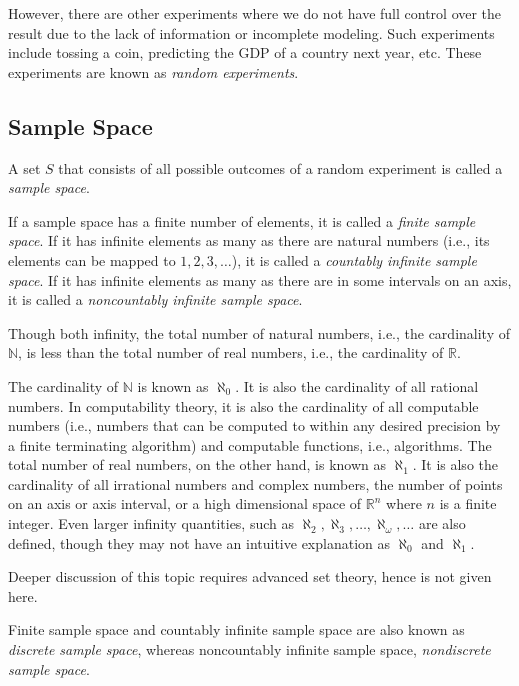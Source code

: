 However, there are other experiments where we do not have full control over the result due to the lack of information or incomplete modeling. Such experiments include tossing a coin, predicting the GDP of a country next year, etc. These experiments are known as \textit{random experiments}.

\subsection{Sample Space}

A set $S$ that consists of all possible outcomes of a random experiment is called a \textit{sample space}. 

If a sample space has a finite number of elements, it is called a \textit{finite sample space}. If it has infinite elements as many as there are natural numbers (i.e., its elements can be mapped to $1, 2, 3, \ldots$), it is called a \textit{countably infinite sample space}. If it has infinite elements as many as there are in some intervals on an axis, it is called a \textit{noncountably infinite sample space}. 

\begin{shortbox}
Though both infinity, the total number of natural numbers, i.e., the cardinality of $\mathbb{N}$, is less than the total number of real numbers, i.e., the cardinality of $\mathbb{R}$.

The cardinality of $\mathbb{N}$ is known as $\aleph_0$. It is also the cardinality of all rational numbers. In computability theory, it is also the cardinality of all computable numbers (i.e., numbers that can be computed to within any desired precision by a finite terminating algorithm) and computable functions, i.e., algorithms. The total number of real numbers, on the other hand, is known as $\aleph_1$. It is also the cardinality of all irrational numbers and complex numbers, the number of points on an axis or axis interval, or a high dimensional space of $\mathbb{R}^n$ where $n$ is a finite integer. Even larger infinity quantities, such as $\aleph_2, \aleph_3, \ldots, \aleph_\omega, \ldots$ are also defined, though they may not have an intuitive explanation as $\aleph_0$ and $\aleph_1$.

Deeper discussion of this topic requires advanced set theory, hence is not given here.
\end{shortbox}

Finite sample space and countably infinite sample space are also known as \textit{discrete sample space}, whereas noncountably infinite sample space, \textit{nondiscrete sample space}.


